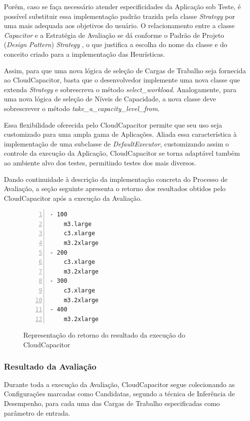 Porém, caso se faça necessário atender especificidades da Aplicação sob Teste, 
é possível substituir essa implementação padrão trazida pela classe \emph{Strategy} 
por uma mais adequada aos objetivos do usuário. O relacionamento entre a classe 
\emph{Capacitor} e a Estratégia de Avaliação se dá conforme o Padrão de Projeto 
(\emph{Design Pattern}) \emph{Strategy} \cite{gamma}, o que justifica a escolha 
do nome da classe e do conceito criado para a implementação das Heurísticas.

Assim, para que uma nova lógica de seleção de Cargas de Trabalho seja fornecida
ao CloudCapacitor, basta que o desenvolvedor implemente uma nova classe que extenda
\emph{Strategy} e sobrescreva o método \emph{select\_workload}. Analogamente,
para uma nova lógica de seleção de Níveis de Capacidade, a nova classe deve 
sobrescrever o método \emph{take\_a\_capacity\_level\_from}.

Essa flexibilidade oferecida pelo CloudCapacitor permite que seu uso seja 
customizado para uma ampla gama de Aplicações. Aliada essa característica à 
implementação de uma subclasse de \emph{DefaultExecutor}, customizando assim o 
controle da execução da Aplicação, CloudCapacitor se torna adaptável também ao
ambiente alvo dos testes, permitindo testes dos mais diversos.

Dando continuidade à descrição da implementação concreta do Processo de Avaliação,
a seção seguinte apresenta o retorno dos resultados obtidos pelo CloudCapacitor
após a execução da Avaliação.

\begin{figure}[h]
 \begin{lstlisting}[linewidth=\textwidth,xleftmargin=.04\textwidth, numbers=left]
- 100
    m3.large
    c3.xlarge
    m3.2xlarge
- 200
    c3.xlarge
    m3.2xlarge
- 300
    c3.xlarge
    m3.2xlarge
- 400
    m3.2xlarge
  \end{lstlisting}
  \caption{\label{fig:resultado}Representação do retorno do resultado da execução do CloudCapacitor}
\end{figure}

\subsubsection{Resultado da Avaliação}
\label{subsubsec:funcionamento_resultado}
Durante toda a execução da Avaliação, CloudCapacitor segue colecionando as
Configurações marcadas como Candidatas, segundo a técnica de Inferência de 
Desempenho, para cada uma das Cargas de Trabalho especificadas como parâmetro de 
entrada.

